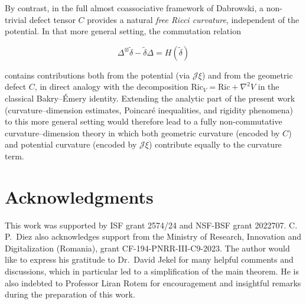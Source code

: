 \documentclass[10pt,a4paper,reqno]{amsart}
\begin{document}
By contrast, in the full almost coassociative framework of Dabrowski, a
non-trivial defect tensor $C$ provides a natural \emph{free Ricci
curvature}, independent of the potential.  In that more general setting, the
commutation relation


\[
\Delta^{\otimes}\tilde\delta - \tilde\delta\Delta = H(\tilde\delta)
\]


contains contributions both from the potential (via $\mathscr{J}\xi$) and from
the geometric defect $C$, in direct analogy with the decomposition
$\mathrm{Ric}_V = \mathrm{Ric} + \nabla^2V$ in the classical Bakry--Émery
identity.  Extending the analytic part of the present work (curvature--dimension
estimates, Poincaré inequalities, and rigidity phenomena) to this more general
setting would therefore lead to a fully non-commutative curvature--dimension
theory in which both geometric curvature (encoded by $C$) and potential
curvature (encoded by $\mathscr{J}\xi$) contribute equally to the curvature
term.



\section{Acknowledgments}
This work was supported by ISF grant 2574/24 and NSF-BSF grant 2022707.
C.\,P.~Diez also acknowledges support from the Ministry of Research, Innovation and Digitalization (Romania), grant CF-194-PNRR-III-C9-2023. The author would like to express his gratitude to Dr.~David Jekel for many helpful comments and discussions, which in particular led to a simplification of the main theorem. He is also indebted to Professor Liran Rotem for encouragement and insightful remarks during the preparation of this work.
\end{document}
